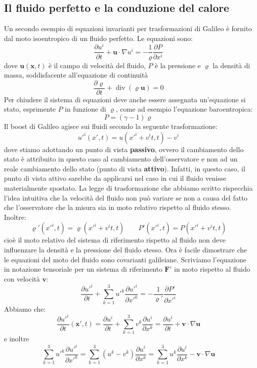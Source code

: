 \documentclass[a4paper,11pt]{book}
\theoremstyle{plain}
\theoremstyle{definition}
\DeclareMathOperator*{\Div}{div}
\begin{document}
\subsection{Il fluido perfetto e la conduzione del calore}
Un secondo esempio di equazioni invarianti per trasformazioni di Galileo è fornito dal moto isoentropico di un fluido perfetto. Le equazioni sono:
\[
\frac{\partial u^i}{\partial t}+\textbf{u}\cdot \nabla u^i=-\frac{1}{\varrho}\frac{\partial P}{\partial x^i} 
\]
dove $\textbf{u}(\textbf{x},t)$ è il campo di velocità del fluido, $P$ è la pressione e $\varrho$ la densità di massa, soddisfacente all'equazione di continuità
\[
\frac{\partial \varrho}{\partial t}+\Div(\varrho\textbf{u})=0
\]
Per chiudere il sistema di equazioni deve anche essere assegnata un'equazione si stato, esprimente $P$ in funzione di $\varrho$, come ad esempio l'equazione baroentropica: 
\[
P=(\gamma-1)\varrho
\]
Il boost di Galileo agisce sui fluidi secondo la seguente trasformazione:
\[
u'^i(x',t)=u(x'^i+v^it,t)-v^i
\]
dove stiamo adottando un punto di vista \textbf{passivo}, ovvero il cambiamento dello stato è attribuito in questo caso al cambiamento dell'osservatore e non ad un reale cambiamento dello stato (punto di vista \textbf{attivo}). Infatti, in questo caso, il punto di vista attivo sarebbe da applicarsi nel caso in cui il fluido venisse materialmente spostato. La legge di trasformazione che abbiamo scritto rispecchia l'idea intuitiva che la velocità del fluido non può variare se non a causa del fatto che l'osservatore che la misura sia in moto relativo rispetto al fluido stesso. Inoltre:
\[
\varrho'(x'^i,t)=\varrho (x'^i+v^it,t) \qquad P'(x'^i,t)=P(x'^i+v^it,t)
\]
cioè il moto relativo del sistema di riferimento rispetto al fluido non deve influenzare la densità e la pressione del fluido stesso. Ora è facile dimostrare che le equazioni del moto del fluido sono covarianti galileiane. Scriviamo l'equazione in notazione tensoriale per un sistema di riferimento $\textbf{F}'$ in moto rispetto al fluido con velocità $\textbf{v}$:
\[
\frac{\partial u'^i}{\partial t}+\sum_{k=1}^3 u'^k \frac{\partial u'^i}{\partial x'^k}=-\frac{1}{\varrho'}\frac{\partial P'}{\partial x'^i} 
\]
Abbiamo che:
\[
\frac{\partial u'^i}{\partial t}(\textbf{x}',t)=\frac{\partial u^i}{\partial t}+\sum_{k=1}^3 v^k \frac{\partial u^i}{\partial x^k}=\frac{\partial u^i}{\partial t}+\textbf{v}\cdot \nabla \textbf{u}
\]
e inoltre
\[
\sum_{k=1}^3 u'^k \frac{\partial u'^i}{\partial x'^k}=\sum_{k=1}^3(u^k-v^k)\frac{\partial u^i}{\partial x^k}=\sum_{k=1}^3 u^k \frac{\partial u^i}{\partial x^k}-\textbf{v}\cdot \nabla \textbf{u}
\]
\end{document}
